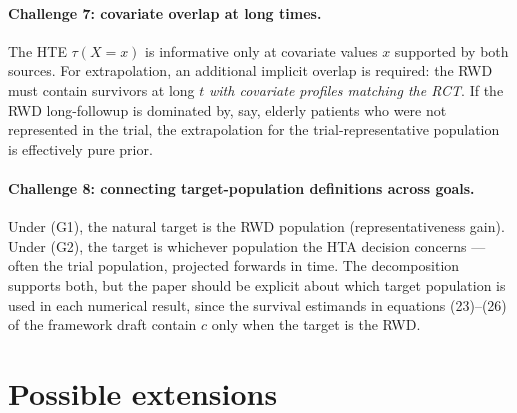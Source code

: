 \documentclass[11pt]{article}
\theoremstyle{plain}
\theoremstyle{definition}
\theoremstyle{remark}
\newcommand{\1}{\mathds{1}}
\newcommand{\X}{X}
\newcommand{\tauf}{\tau}
\newcommand{\cf}{c}
\begin{document}
\paragraph{Challenge 7: covariate overlap at long times.}
The HTE $\tauf(\X=x)$ is informative only at covariate values $x$ supported
by both sources. For extrapolation, an additional implicit overlap is
required: the RWD must contain survivors at long $t$ \emph{with covariate
profiles matching the RCT}. If the RWD long-followup is dominated by, say,
elderly patients who were not represented in the trial, the extrapolation
for the trial-representative population is effectively pure prior.

\paragraph{Challenge 8: connecting target-population definitions across goals.}
Under (G1), the natural target is the RWD population (representativeness
gain). Under (G2), the target is whichever population the HTA decision
concerns --- often the trial population, projected forwards in time. The
decomposition supports both, but the paper should be explicit about which
target population is used in each numerical result, since the survival
estimands in equations (23)--(26) of the framework draft contain $\cf$
only when the target is the RWD.

\section{Possible extensions}
\end{document}
